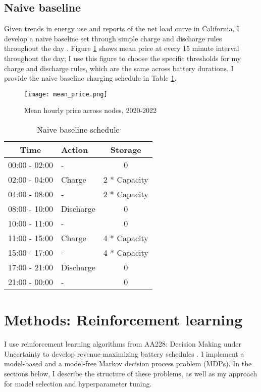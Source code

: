 \documentclass[conference]{IEEEtran}
\begin{document}
\subsection{Naive baseline}
Given trends in energy use and reports of the net load curve in California, I develop a naive baseline set through simple charge and discharge rules throughout the day \cite{CAISO}. Figure \ref{fig:mp} shows mean price at every 15 minute interval throughout the day; I use this figure to choose the specific thresholds for my charge and discharge rules, which are the same across battery durations. I provide the naive baseline charging schedule in Table \ref{tab:naive}.

\begin{figure}[htbp]
    \caption{\label{fig:mp} Mean hourly price across nodes, 2020-2022}
\centerline{\texttt{[image: mean\_price.png]}}
\end{figure}


\begin{table}[htbp]
    \caption{\label{tab:naive} Naive baseline schedule}
    \begin{center}
        \begin{tabular}{clc}
            \hline
            \textbf{Time} & \textbf{Action} & \textbf{Storage} \\
            \hline
            00:00 - 02:00 & - & 0 \\
            02:00 - 04:00 & Charge & 2 * Capacity \\
            04:00 - 08:00 & - & 2 * Capacity \\
            08:00 - 10:00 & Discharge & 0 \\
            10:00 - 11:00 & - & 0 \\
            11:00 - 15:00 & Charge & 4 * Capacity \\
            15:00 - 17:00 & - & 4 * Capacity \\
            17:00 - 21:00 & Discharge & 0 \\
            21:00 - 00:00 & - & 0 \\
            \hline
        \end{tabular}
    \end{center}
\end{table}

\section{Methods: Reinforcement learning}
I use reinforcement learning algorithms from AA228: Decision Making under Uncertainty to develop revenue-maximizing battery schedules \cite{kochenderfer}. I implement a model-based and a model-free Markov decision process problem (MDPs). In the sections below, I describe the structure of these problems, as well as my approach for model selection and hyperparameter tuning.
\end{document}
